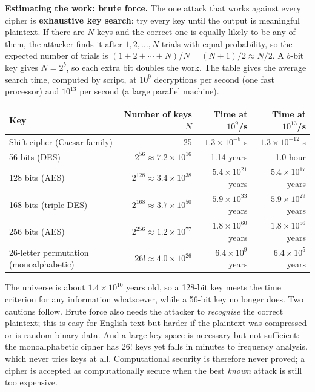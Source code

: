 \textbf{Estimating the work: brute force.} The one attack that works against every cipher is \textbf{exhaustive key search}: try every key until the output is meaningful plaintext. If there are $N$ keys and the correct one is equally likely to be any of them, the attacker finds it after $1, 2, \dots, N$ trials with equal probability, so the expected number of trials is $(1 + 2 + \cdots + N)/N = (N+1)/2 \approx N/2$. A $b$-bit key gives $N = 2^b$, so each extra bit doubles the work. The table gives the average search time, computed by script, at $10^9$ decryptions per second (one fast processor) and $10^{13}$ per second (a large parallel machine).
\begin{center}\small
\begin{tabular}{@{}lrrr@{}}
\toprule
Key & Number of keys $N$ & Time at $10^9$/s & Time at $10^{13}$/s\\
\midrule
Shift cipher (Caesar family) & 25 & $1.3 \times 10^{-8}$ s & $1.3 \times 10^{-12}$ s\\
56 bits (DES) & $2^{56} \approx 7.2 \times 10^{16}$ & 1.14 years & 1.0 hour\\
128 bits (AES) & $2^{128} \approx 3.4 \times 10^{38}$ & $5.4 \times 10^{21}$ years & $5.4 \times 10^{17}$ years\\
168 bits (triple DES) & $2^{168} \approx 3.7 \times 10^{50}$ & $5.9 \times 10^{33}$ years & $5.9 \times 10^{29}$ years\\
256 bits (AES) & $2^{256} \approx 1.2 \times 10^{77}$ & $1.8 \times 10^{60}$ years & $1.8 \times 10^{56}$ years\\
26-letter permutation (monoalphabetic) & $26! \approx 4.0 \times 10^{26}$ & $6.4 \times 10^{9}$ years & $6.4 \times 10^{5}$ years\\
\bottomrule
\end{tabular}
\end{center}
The universe is about $1.4 \times 10^{10}$ years old, so a 128-bit key meets the time criterion for any information whatsoever, while a 56-bit key no longer does. Two cautions follow. Brute force also needs the attacker to \emph{recognise} the correct plaintext; this is easy for English text but harder if the plaintext was compressed or is random binary data. And a large key space is necessary but not sufficient: the monoalphabetic cipher has $26!$ keys yet falls in minutes to frequency analysis, which never tries keys at all. Computational security is therefore never proved; a cipher is accepted as computationally secure when the best \emph{known} attack is still too expensive.

